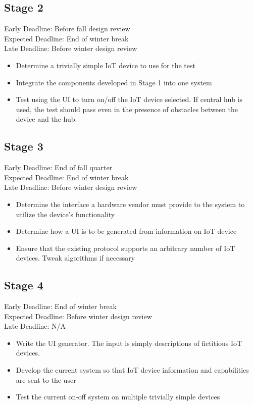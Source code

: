\documentclass{article}
\begin{document}
\subsection{Stage 2}
Early Deadline: Before fall design review \\
Expected Deadline: End of winter break \\
Late Deadline: Before winter design review \\
\begin{itemize}
\item Determine a trivially simple IoT device to use for the test
\item Integrate the components developed in Stage 1 into one system
\item Test using the UI to turn on/off the IoT device selected. If central hub is used, the test should pass even in the presence of obstacles between the device and the hub.
\end{itemize}

\subsection{Stage 3}
Early Deadline: End of fall quarter \\
Expected Deadline: End of winter break \\
Late Deadline: Before winter design review \\
\begin{itemize}
\item Determine the interface a hardware vendor must provide to the system to utilize the device's functionality
\item Determine how a UI is to be generated from information on IoT device
\item Ensure that the existing protocol supports an arbitrary number of IoT devices. Tweak algorithms if necessary
\end{itemize}

\subsection{Stage 4}
Early Deadline: End of winter break \\
Expected Deadline: Before winter design review \\
Late Deadline: N/A \\
\begin{itemize}
\item Write the UI generator. The input is simply descriptions of fictitious IoT devices.
\item Develop the current system so that IoT device information and capabilities are sent to the user
\item Test the current on-off system on multiple trivially simple devices
\end{itemize}
\end{document}
